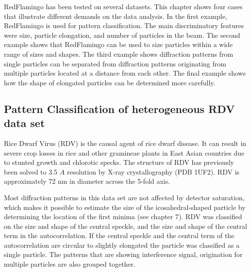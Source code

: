 RedFlamingo has been tested on several datasets. This chapter shows four cases that illustrate different demands on the data analysis. In the first example, RedFlamingo is used for pattern classification. The main discriminatory features were size, particle elongation, and number of particles in the beam. The second example shows that RedFlamingo can be used to size particles within a wide range of sizes and shapes. The third example shows diffraction patterns from single particles can be separated from diffraction patterns originating from multiple particles located at a distance from each other. The final example shows how the shape of elongated particles can be determined more carefully. 

\subsection{Pattern Classification of heterogeneous RDV data set}
Rice Dwarf Virus (RDV) is the causal agent of rice dwarf disease. It can result in severe crop losses in rice and other gramineae plants in East Asian countries due to stunted growth and chlorotic specks. The structure of RDV has previously been solved to 3.5 $A$ resolution by X-ray crystallography \cite{Nakagawa2003} (PDB 1UF2). RDV is approximately 72 nm in diameter across the 5-fold axis.

Most diffraction patterns in this data set are not affected by detector saturation, which makes it possible to estimate the size of the icosahedral-shaped particle by determining the location of the first minima (see chapter 7).
RDV was classified on the size and shape of the central speckle, and the size and shape of the central term in the autocorrelation. If the central speckle and the central term of the autocorrelation are circular to slightly elongated the particle was classified as a single particle.  
The patterns that are showing interference signal, origination for multiple particles are also grouped together.

